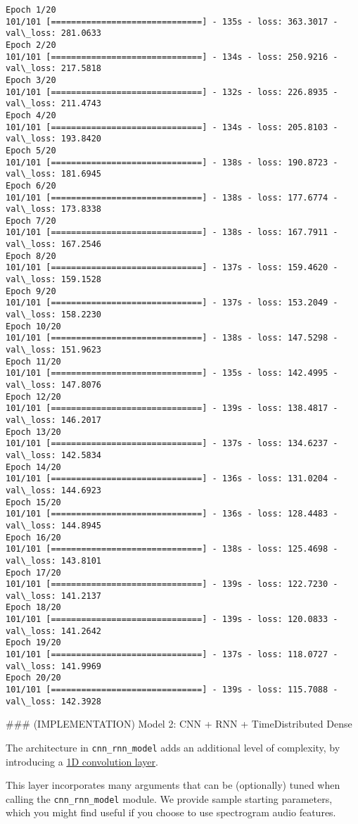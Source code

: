 \documentclass[11pt]{article}
\begin{document}
    \begin{Verbatim}[commandchars=\\\{\}]
Epoch 1/20
101/101 [==============================] - 135s - loss: 363.3017 - val\_loss: 281.0633
Epoch 2/20
101/101 [==============================] - 134s - loss: 250.9216 - val\_loss: 217.5818
Epoch 3/20
101/101 [==============================] - 132s - loss: 226.8935 - val\_loss: 211.4743
Epoch 4/20
101/101 [==============================] - 134s - loss: 205.8103 - val\_loss: 193.8420
Epoch 5/20
101/101 [==============================] - 138s - loss: 190.8723 - val\_loss: 181.6945
Epoch 6/20
101/101 [==============================] - 138s - loss: 177.6774 - val\_loss: 173.8338
Epoch 7/20
101/101 [==============================] - 138s - loss: 167.7911 - val\_loss: 167.2546
Epoch 8/20
101/101 [==============================] - 137s - loss: 159.4620 - val\_loss: 159.1528
Epoch 9/20
101/101 [==============================] - 137s - loss: 153.2049 - val\_loss: 158.2230
Epoch 10/20
101/101 [==============================] - 138s - loss: 147.5298 - val\_loss: 151.9623
Epoch 11/20
101/101 [==============================] - 135s - loss: 142.4995 - val\_loss: 147.8076
Epoch 12/20
101/101 [==============================] - 139s - loss: 138.4817 - val\_loss: 146.2017
Epoch 13/20
101/101 [==============================] - 137s - loss: 134.6237 - val\_loss: 142.5834
Epoch 14/20
101/101 [==============================] - 136s - loss: 131.0204 - val\_loss: 144.6923
Epoch 15/20
101/101 [==============================] - 136s - loss: 128.4483 - val\_loss: 144.8945
Epoch 16/20
101/101 [==============================] - 138s - loss: 125.4698 - val\_loss: 143.8101
Epoch 17/20
101/101 [==============================] - 139s - loss: 122.7230 - val\_loss: 141.2137
Epoch 18/20
101/101 [==============================] - 139s - loss: 120.0833 - val\_loss: 141.2642
Epoch 19/20
101/101 [==============================] - 137s - loss: 118.0727 - val\_loss: 141.9969
Epoch 20/20
101/101 [==============================] - 139s - loss: 115.7088 - val\_loss: 142.3928

    \end{Verbatim}

     \#\#\# (IMPLEMENTATION) Model 2: CNN + RNN + TimeDistributed Dense

The architecture in \texttt{cnn\_rnn\_model} adds an additional level of
complexity, by introducing a
\href{https://keras.io/layers/convolutional/\#conv1d}{1D convolution
layer}.

This layer incorporates many arguments that can be (optionally) tuned
when calling the \texttt{cnn\_rnn\_model} module. We provide sample
starting parameters, which you might find useful if you choose to use
spectrogram audio features.
\end{document}
